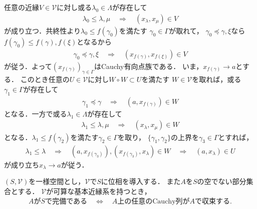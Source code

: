 	\begin{prf}
		任意の近縁$V \in \mathscr{V}$に対し或る$\lambda_0 \in \Lambda$が存在して
		\begin{align}
			\lambda_0 \leq \lambda,\mu
			\quad \Longrightarrow \quad
			(x_\lambda,x_\mu) \in V
		\end{align}
		が成り立つ．共終性より$\lambda_0 \leq f(\gamma_0)$を満たす
		$\gamma_0 \in \Gamma$が取れて，
		$\gamma_0 \preceq \gamma, \xi$なら
		$f(\gamma_0) \leq f(\gamma),f(\xi)$となるから
		\begin{align}
			\gamma_0 \preceq \gamma,\xi
			\quad \Longrightarrow \quad
			\left(x_{f(\gamma)},x_{f(\xi)}\right) \in V
		\end{align}
		が従う．よって$(x_{f(\gamma)})_{\gamma \in \Gamma}$はCauchy有向点族である．
		いま，$x_{f(\gamma)} \longrightarrow a$とする．
		このとき任意の$U \in \mathscr{V}$に対し$W \circ W \subset U$を満たす
		$W \in \mathscr{V}$を取れば，或る$\gamma_1 \in \Gamma$が存在して
		\begin{align}
			\gamma_1 \preceq \gamma
			\quad \Longrightarrow \quad
			\left(a,x_{f(\gamma)}\right) \in W
		\end{align}
		となる．一方で或る$\lambda_1 \in \Lambda$が存在して
		\begin{align}
			\lambda_1 \leq \lambda,\mu
			\quad \Longrightarrow \quad
			(x_\lambda,x_\mu) \in W
		\end{align}
		となる．$\lambda_1 \leq f(\gamma_2)$を満たす$\gamma_2 \in \Gamma$を取り，
		$\{\gamma_1,\gamma_2\}$の上界を$\gamma_3 \in \Gamma$とすれば，
		\begin{align}
			\lambda_1 \leq \lambda \quad \Longrightarrow \quad
			\left(a,x_{f(\gamma_3)}\right),
			\left(x_{f(\gamma_3)},x_\lambda\right) \in W
			\quad \Longrightarrow \quad
			(a,x_\lambda) \in U
		\end{align}
		が成り立ち$x_\lambda \longrightarrow a$が従う．
		\QED
	\end{prf}
	
	\begin{screen}
		\begin{thm}
		\label{thm:complete_iff_every_Cauchy_seq_converges_if_entourage_contains_some_countable_subset}
			$(S,\mathscr{V})$を一様空間とし，$\mathscr{V}$で$S$に位相を導入する．
			また$A$を$S$の空でない部分集合とする．
			$\mathscr{V}$が可算な基本近縁系を持つとき，
			\begin{align}
				\mbox{$A$が$S$で完備である} \quad \Longleftrightarrow \quad
				\mbox{$A$上の任意のCauchy列が$A$で収束する}.
			\end{align}
		\end{thm}
	\end{screen}
	
